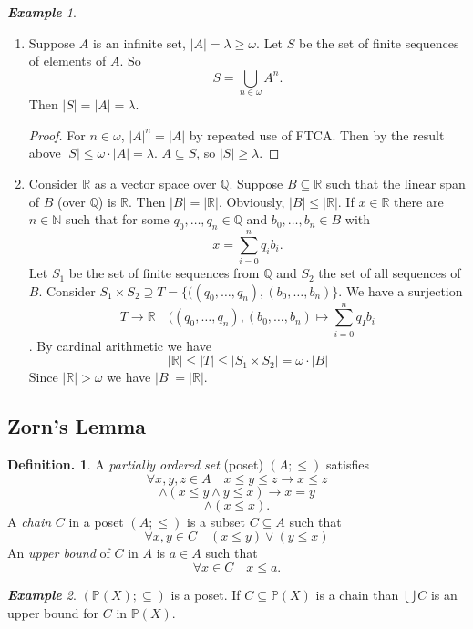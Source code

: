 \documentclass[a4paper,oneside,11pt,DIV=12,parskip=half]{scrartcl}
\newcommand{\R}{\mathbb R}
\newcommand{\N}{\mathbb N}
\theoremstyle{plain}
\theoremstyle{definition}
\newtheorem{definition}[theorem]{Definition.}
\newtheorem{remark, definition}[theorem]{Remark and Definition.}
\newtheorem{lemma, definition}[theorem]{Lemma and Definition.}
\newtheorem{theorem, definition}[theorem]{Theorem and Definition.}
\theoremstyle{remark}
\newtheorem*{example}{\textbf{Example}}
\newtheorem*{remark, example}{\textbf{Remark and Exercise}}
\begin{document}
\begin{example}
\begin{enumerate}
    \item Suppose $A$ is an infinite set, $|A| = \lambda \geq \omega$. Let $S$ be the set of finite sequences of elements of $A$. So 
    \[ S = \bigcup_{n \in \omega} A^n .\]
    Then $|S| = |A| = \lambda$.
        \begin{proof}
        For $n \in \omega$, $|A|^n = |A|$ by repeated use of FTCA. Then by the result above $|S| \leq \omega \cdot |A| = \lambda.$
        $A \subseteq S$, so  $|S| \geq \lambda$.
        \end{proof}
    \item Consider $\R$ as a vector space over $\mathbb{Q}$. Suppose $B \subseteq \R$ such that the linear span of $B$ (over $\mathbb{Q}$) is $\R$. Then $|B| = |\R|$.
    Obviously, $|B| \leq |\R|$. If $x \in \R$ there are $n \in \N$ such that for some $q_0,\dots,q_n \in \mathbb{Q}$ and $b_0,\dots,b_n \in B$ with 
        \[ x = \sum_{i = 0}^{n} q_i b_i. \]
    Let $S_1$ be the set of finite sequences from $\mathbb{Q}$ and $S_2$ the set of all sequences of $B$.
    Consider $S_1 \times S_2 \supseteq T = \{ ((q_0,\dots,q_n),(b_0,\dots,b_n)\}$. We have a surjection \[T \rightarrow \R \quad ((q_0,\dots,q_n),(b_0,\dots,b_n) \mapsto \sum_{i=0}^n q_I b_i \]. By cardinal arithmetic we have
    \[ |\R| \leq |T| \leq |S_1 \times S_2| = \omega \cdot |B| \]
    Since $|\R| > \omega$ we have $|B| = |\R|$. 
\end{enumerate}
\end{example}

\subsection{Zorn's Lemma}

\begin{definition}
A \emph{partially ordered set} (poset) $(A;\leq)$ satisfies
    \[ \forall x,y,z \in A \quad x \leq y \leq z \rightarrow x \leq z \]
    \[ \land (x \leq y \land y \leq x) \rightarrow x = y \]
    \[ \land (x \leq x). \]
A \emph{chain} $C$ in a poset $(A;\leq)$ is a subset $C \subseteq A$ such that 
\[ \forall x,y \in C \quad (x \leq y) \lor (y \leq x) \]
An \emph{upper bound} of $C$ in $A$ is $a \in A$ such that \[\forall x \in C \quad x \leq a.\]
\end{definition}

\begin{example}
$(\mathbb{P}(X);\subseteq)$ is a poset.
If $C \subseteq \mathbb{P}(X)$ is a chain than $\bigcup C$ is an upper bound for $C$ in $\mathbb{P}(X)$.
\end{example}
\end{document}
